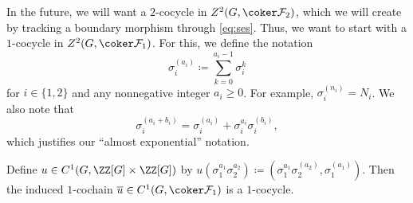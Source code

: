 \documentclass{article}
\begin{document}
In the future, we will want a $2$-cocycle in $Z^2(G,\coker\mathcal F_2)$, which we will create by tracking a boundary morphism through \autoref{eq:ses}. Thus, we want to start with a $1$-cocycle in $Z^2(G,\coker\mathcal F_1)$. For this, we define the notation
\[\sigma_i^{(a_i)}\coloneqq\sum_{k=0}^{a_i-1}\sigma_i^k\]
for $i\in\{1,2\}$ and any nonnegative integer $a_i\ge0$. For example, $\sigma_i^{(n_i)}=N_i$. We also note that
\[\sigma_i^{(a_i+b_i)}=\sigma_i^{(a_i)}+\sigma_i^{a_i}\sigma_i^{(b_i)},\]
which justifies our ``almost exponential'' notation.
\begin{lemma}
	Define $u\in C^1(G,\ZZ[G]\times\ZZ[G])$ by $u\left(\sigma_1^{a_1}\sigma_2^{a_2}\right)\coloneqq\left(\sigma_1^{a_1}\sigma_2^{(a_2)},\sigma_1^{(a_1)}\right)$. Then the induced $1$-cochain $\overline u\in C^1(G,\coker\mathcal F_1)$ is a $1$-cocycle.
\end{lemma}
\end{document}
